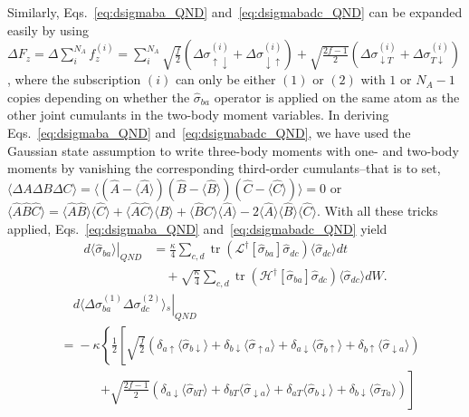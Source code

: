 \documentclass[aps,pra,twocolumn,superscriptaddress]{revtex4-1} %
\DeclareMathOperator{\tr}{tr}
\newcommand{\nn}{\nonumber}
\newcommand{\expect}[1]{\big\langle #1 \big\rangle}
\begin{document}
\begin{appendix}
Similarly, Eqs.~\eqref{eq:dsigmaba_QND} and~\eqref{eq:dsigmabadc_QND} can be expanded easily by using $ \Delta F_z=\Delta \sum_i^{N_A} f_z^{(i)}=\sum_i^{N_A} \sqrt{\frac{f}{2}}(\Delta\sigma_{\uparrow\downarrow}^{(i)}+\Delta\sigma_{\downarrow\uparrow}^{(i)}) + \sqrt{\frac{2f-1}{2}}(\Delta \sigma_{\downarrow T}^{(i)}+\Delta\sigma_{T\downarrow}^{(i)}) $, where the subscription $ (i) $ can only be either $ (1) $ or $ (2) $ with $ 1 $ or $ N_A-1 $ copies depending on whether the $ \hat{\sigma}_{ba} $ operator is applied on the same atom as the other joint cumulants in the two-body moment variables. In deriving Eqs.~\eqref{eq:dsigmaba_QND} and~\eqref{eq:dsigmabadc_QND}, we have used the Gaussian state assumption to write three-body moments with one- and two-body moments by vanishing the corresponding third-order cumulants--that is to set, $ \expect{\Delta A\Delta B\Delta C }=\expect{(\hat{A}-\expect{\hat{A}} )(\hat{B}-\expect{\hat{B}})(\hat{C}-\expect{\hat{C}}) } =0$ or $ \expect{\hat{A}\hat{B}\hat{C}}=\expect{\hat{A}\hat{B}}\expect{\hat{C}}+ \expect{\hat{A}\hat{C} }\expect{\hat{B}}+\expect{\hat{B}\hat{C} }\expect{\hat{A}}-2\expect{\hat{A}}\expect{\hat{B}}\expect{\hat{C}} $. With all these tricks applied, Eqs.~\eqref{eq:dsigmaba_QND} and~\eqref{eq:dsigmabadc_QND} yield
\begin{align}\label{eq:dsigmaba_QND_expand}
\left.d\expect{\!\hat{\sigma}_{ba}\!}\right|_{QN\!D} &=\frac{\kappa}{4}\sum_{c,d}\tr\left(\mathcal{L}^\dagger\left[\hat{\sigma}_{ba} \right]\hat{\sigma}_{dc}\right) \expect{\hat{\sigma}_{dc}}dt \nn\\
&\quad +\!\! \sqrt{\frac{\kappa}{4}}\!\sum_{c,d}\!\tr\left(\mathcal{H}^\dagger\!\left[\hat{\sigma}_{ba} \right]\!\hat{\sigma}_{dc}\right)\! \expect{\!\hat{\sigma}_{dc}\!}dW .
\end{align}
\begin{align}
&\quad\left.d\expect{\!\Delta \sigma_{ba}^{(\!1\!)}\! \Delta \sigma_{dc}^{(\!2\!)}}\!_s \right|_{QN\!D} \nn\\
&=\!\! -\kappa\!\left\{\!\frac{1}{2}\!\left[ \sqrt{\frac{f}{2}}\!\left(\delta_{a\uparrow}\expect{\!\hat{\sigma}_{b\downarrow}\!}\!+\! \delta_{b\downarrow}\expect{\!\hat{\sigma}_{\uparrow a}\!}\!+\!\delta_{a\downarrow}\expect{\!\hat{\sigma}_{b\uparrow}\!} \!+\!\delta_{b\uparrow}\expect{\!\hat{\sigma}_{\downarrow a}\! } \right)\right.\right.\nn\\
&\quad\quad\,\quad\left. +\sqrt{\frac{2f\!-\!1}{2}}\!\left(\delta_{a\downarrow}\! \expect{\!\hat{\sigma}_{bT}\!} \!\!+\! \delta_{bT}\expect{\!\hat{\sigma}_{\downarrow a}\! } \!\!+\!\delta_{aT}\expect{\!\hat{\sigma}_{b\downarrow}\! } \!\!+\!\delta_{b\downarrow}\!\expect{\!\hat{\sigma}_{Ta}\! } \!\right)\!\right] \nn\\

\end{align}
\end{appendix}
\end{document}
